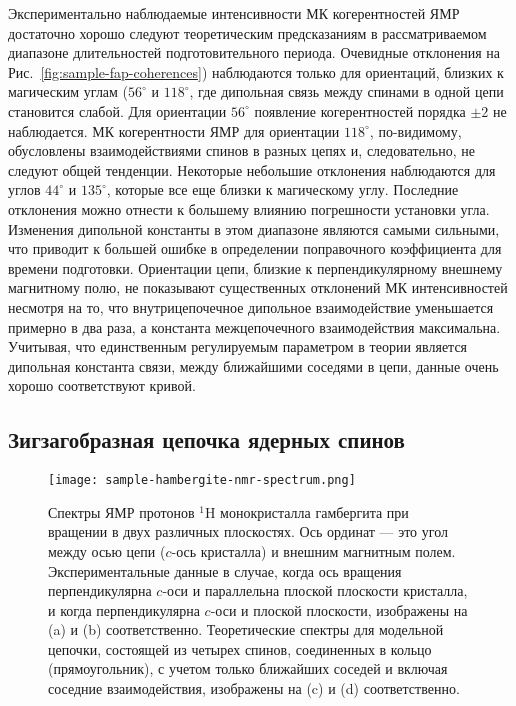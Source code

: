Экспериментально наблюдаемые интенсивности МК когерентностей ЯМР достаточно хорошо следуют теоретическим предсказаниям
в рассматриваемом диапазоне длительностей подготовительного периода.
Очевидные отклонения на Рис.~\ref{fig:sample-fap-coherences}) наблюдаются только для ориентаций,
близких к магическим углам ($56^\circ$ и $118^\circ$,
где дипольная связь между спинами в одной цепи становится слабой.
Для ориентации $56^\circ$ появление когерентностей порядка $\pm2$ не наблюдается.
МК когерентности  ЯМР для ориентации $118^\circ$,
по-видимому, обусловлены взаимодействиями спинов в разных цепях и, следовательно, не следуют общей тенденции.
Некоторые небольшие отклонения наблюдаются для углов $44^\circ$ и $135^\circ$,
которые все еще близки к магическому углу.
Последние отклонения можно отнести к большему влиянию погрешности установки угла.
Изменения дипольной константы в этом диапазоне являются самыми сильными,
что приводит к большей ошибке в определении поправочного коэффициента для времени подготовки.
Ориентации цепи, близкие к перпендикулярному внешнему магнитному полю,
не показывают существенных отклонений МК интенсивностей несмотря на то,
что внутрицепочечное дипольное взаимодействие уменьшается примерно в два раза,
а константа межцепочечного взаимодействия максимальна.
Учитывая, что единственным регулируемым параметром в теории является дипольная константа связи,
между ближайшими соседями в цепи, данные очень хорошо соответствуют кривой.




\subsection{Зигзагобразная цепочка ядерных спинов}
\label{sec:model-zigzag-chain}

\begin{figure}
  \centering
  \texttt{[image: sample-hambergite-nmr-spectrum.png]}
  \caption{
    Спектры ЯМР протонов $^1$H монокристалла гамбергита при вращении в двух различных плоскостях.
    Ось ординат --- это угол между осью цепи ($c$-ось кристалла) и внешним магнитным полем.
    Экспериментальные данные в случае, когда
    ось вращения перпендикулярна $c$-оси и параллельна плоской плоскости кристалла,
    и когда перпендикулярна $c$-оси и плоской плоскости,
    изображены на (a) и (b) соответственно.
    Теоретические спектры для модельной цепочки,
    состоящей из четырех спинов, соединенных в кольцо (прямоугольник),
    с учетом только ближайших соседей и включая соседние взаимодействия,
    изображены на (c) и (d) соответственно.
  }
  \label{fig:sample-hambergite-nmr-spectrum}
\end{figure}

